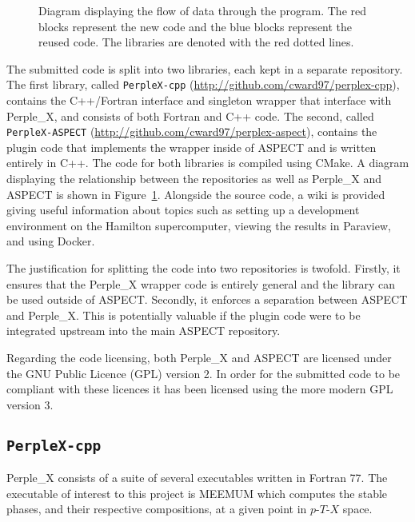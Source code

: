 \begin{figure}
    \centering
    
    \caption{
        Diagram displaying the flow of data through the program. 
        The red blocks represent the new code and the blue blocks represent the reused code.
        The libraries are denoted with the red dotted lines.
    }
    \label{fig:dataflow}
\end{figure}

The submitted code is split into two libraries, each kept in a separate repository.
The first library, called \texttt{PerpleX-cpp} (\url{http://github.com/cward97/perplex-cpp}), contains the C++/Fortran interface and singleton wrapper that interface with Perple\_X, and consists of both Fortran and C++ code.
The second, called \texttt{PerpleX-ASPECT} (\url{http://github.com/cward97/perplex-aspect}), contains the plugin code that implements the wrapper inside of ASPECT and is written entirely in C++.
The code for both libraries is compiled using CMake.
A diagram displaying the relationship between the repositories as well as Perple\_X and ASPECT is shown in Figure~\ref{fig:dataflow}.
Alongside the source code, a wiki is provided giving useful information about topics such as setting up a development environment on the Hamilton supercomputer, viewing the results in Paraview, and using Docker.

The justification for splitting the code into two repositories is twofold.
Firstly, it ensures that the Perple\_X wrapper code is entirely general and the library can be used outside of ASPECT.
Secondly, it enforces a separation between ASPECT and Perple\_X.
This is potentially valuable if the plugin code were to be integrated upstream into the main ASPECT repository.

Regarding the code licensing, both Perple\_X and ASPECT are licensed under the GNU Public \mbox{Licence} (GPL) version 2.
In order for the submitted code to be compliant with these licences it has been licensed using the more modern GPL version 3.

\subsection{\texttt{PerpleX-cpp}}

Perple\_X consists of a suite of several executables written in Fortran 77.
The executable of interest to this project is MEEMUM which computes the stable phases, and their respective compositions, at a given point in $p$-$T$-$X$ space.

